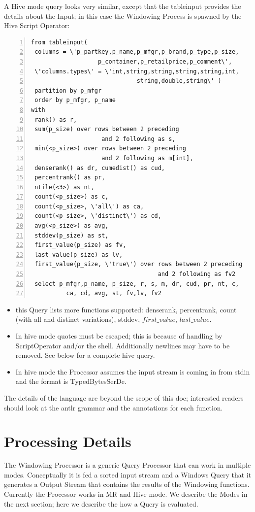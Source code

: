 \documentclass[pdftex,10pt,a4paper]{article}
\begin{document}
  A Hive mode query looks very similar, except that the tableinput
  provides the details about the Input; in this case the Windowing
  Process is spawned by the Hive Script Operator:
  {\small
   \lstset{keywordstyle=\bfseries\underbar, emphstyle=\underbar,
     language=SQL, showspaces=false, showstringspaces=false}
   \begin{lstlisting}[caption={A Hive mode Query},frame=shadowbox, numbers=left]
from tableinput(
 columns = \'p_partkey,p_name,p_mfgr,p_brand,p_type,p_size,
                   p_container,p_retailprice,p_comment\',
 \'columns.types\' = \'int,string,string,string,string,int,
                              string,double,string\' )
 partition by p_mfgr 
 order by p_mfgr, p_name 
with 
 rank() as r, 
 sum(p_size) over rows between 2 preceding 
                    and 2 following as s, 
 min(<p_size>) over rows between 2 preceding 
                    and 2 following as m[int], 
 denserank() as dr, cumedist() as cud, 
 percentrank() as pr, 
 ntile(<3>) as nt, 
 count(<p_size>) as c, 
 count(<p_size>, \'all\') as ca, 
 count(<p_size>, \'distinct\') as cd, 
 avg(<p_size>) as avg, 
 stddev(p_size) as st, 
 first_value(p_size) as fv, 
 last_value(p_size) as lv, 
 first_value(p_size, \'true\') over rows between 2 preceding 
                                    and 2 following as fv2 
 select p_mfgr,p_name, p_size, r, s, m, dr, cud, pr, nt, c, 
          ca, cd, avg, st, fv,lv, fv2
   \end{lstlisting}
   }
  
   \begin{itemize}
   \item this Query lists more functions supported: denserank, percentrank, count (with all and distinct variations), stddev, $first\_value$, $last\_value$.
   \item In hive mode quotes must be escaped; this is because of handling by ScriptOperator and/or the shell. Additionally newlines may have to be removed. See below for a complete hive query.
   \item In hive mode the Processor assumes the input stream is coming in from stdin and the format is TypedBytesSerDe.
   \end{itemize}
   
   The details of the language are beyond the scope of this doc; interested readers should look at the antlr grammar and the annotations for each function.
   
\section{Processing Details}
 The Windowing Processor is a generic Query Processor that can work in multiple modes. Conceptually it is fed a sorted input stream and a Windows Query that it generates a Output Stream that contains the results of the Windowing functions. Currently the Processor works in MR and Hive mode. We describe the Modes in the next section; here we describe the how a Query is evaluated.
\end{document}
